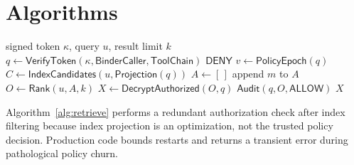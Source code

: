 \section{Algorithms}
\label{sec:algorithm}

\begin{algorithm}[t]
\caption{MemScope retrieval}
\label{alg:retrieve}
\begin{algorithmic}[1]
\Require signed token $\kappa$, query $u$, result limit $k$
\State $q\gets\mathsf{VerifyToken}(\kappa,\mathsf{BinderCaller},\mathsf{ToolChain})$
 \State \Return $\mathsf{DENY}$ \EndIf
\State $v\gets\mathsf{PolicyEpoch}(q)$
\State $C\gets\mathsf{IndexCandidates}(u,\mathsf{Projection}(q))$
\State $A\gets[\,]$
    \State append $m$ to $A$
  \EndIf
\EndFor
\State $O\gets\mathsf{Rank}(u,A,k)$
 
    \State \Return {} 
  \EndIf
\EndFor
{}
  \State \Return {} 
\EndIf
\State $X\gets\mathsf{DecryptAuthorized}(O,q)$
\State $\mathsf{Audit}(q,O,\mathsf{ALLOW})$
\State \Return $X$
\end{algorithmic}
\end{algorithm}

Algorithm~\ref{alg:retrieve} performs a redundant authorization check after index filtering because index projection is an optimization, not the trusted policy decision. Production code bounds restarts and returns a transient error during pathological policy churn.

